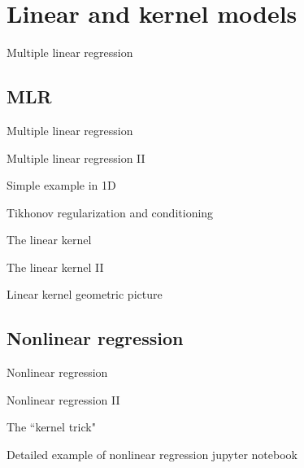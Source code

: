 \section{Linear and kernel models}
\begin{frame}[t]{Multiple linear regression}

\end{frame}
\subsection{MLR}
\begin{frame}[t]{Multiple linear regression}

\end{frame}
\begin{frame}[t]{Multiple linear regression II}

\end{frame}
\begin{frame}[t]{Simple example in 1D}

\end{frame}

\begin{frame}[t]{Tikhonov regularization and conditioning}

\end{frame}

\begin{frame}{The linear kernel}

\end{frame}
\begin{frame}{The linear kernel II}

\end{frame}
\begin{frame}{Linear kernel geometric picture}

\end{frame}
\subsection{Nonlinear regression}
\begin{frame}[t]{Nonlinear regression}

\end{frame}
\begin{frame}[t]{Nonlinear regression II}

\end{frame}
\begin{frame}[t]{The ``kernel trick"}

\end{frame}
\begin{frame}[t]{Detailed example of nonlinear regression}
jupyter notebook
\end{frame}

